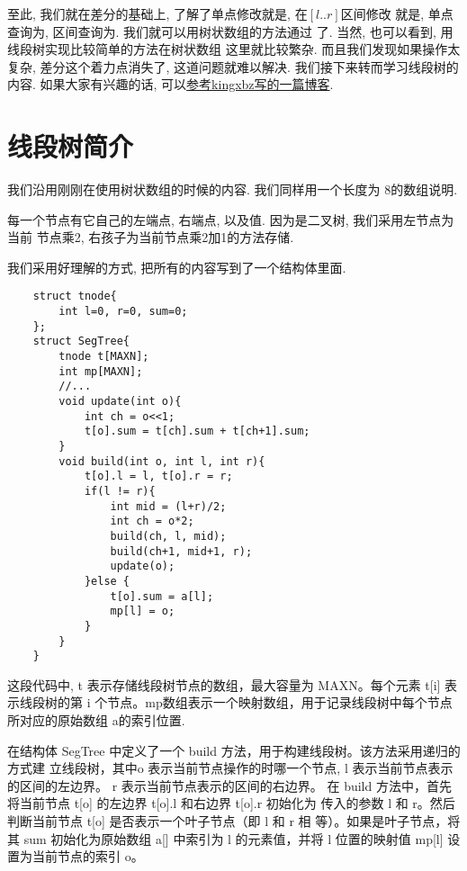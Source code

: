 至此,  我们就在差分的基础上, 了解了单点修改就是, 在$[l..r]$区间修改 
就是, 单点查询为, 
区间查询为. 我们就可以用树状数组的方法通过
了. 当然, 也可以看到, 用线段树实现比较简单的方法在树状数组
这里就比较繁杂. 而且我们发现如果操作太复杂, 差分这个着力点消失了, 这道问题就难以解决. 
我们接下来转而学习线段树的内容. 如果大家有兴趣的话, 可以\href{https://www.luogu.com.cn/blog/kingxbz/shu-zhuang-shuo-zu-zong-ru-men-dao-ru-fen}{参考kingxbz写的一篇博客}.

\section{线段树简介}

 我们沿用刚刚在使用树状数组的时候的内容. 我们同样用一个长度为
8的数组说明. 


每一个节点有它自己的左端点, 右端点, 以及值. 因为是二叉树, 我们采用左节点为当前
节点乘2, 右孩子为当前节点乘2加1的方法存储. 

 我们采用好理解的方式, 把所有的内容写到了一个结构体里面. 
\begin{lstlisting}
    struct tnode{
        int l=0, r=0, sum=0; 
    };
    struct SegTree{
        tnode t[MAXN]; 
        int mp[MAXN];
        //... 
        void update(int o){
            int ch = o<<1;
            t[o].sum = t[ch].sum + t[ch+1].sum;
        }
        void build(int o, int l, int r){
            t[o].l = l, t[o].r = r;
            if(l != r){
                int mid = (l+r)/2;
                int ch = o*2;
                build(ch, l, mid);
                build(ch+1, mid+1, r);
                update(o);
            }else {
                t[o].sum = a[l];
                mp[l] = o;
            }
        }
    }
\end{lstlisting}

这段代码中, t 表示存储线段树节点的数组，最大容量为 MAXN。每个元素 t[i] 表示线段树的第 i 个节点。mp数组表示一个映射数组，用于记录线段树中每个节点所对应的原始数组 a的索引位置.  

在结构体 SegTree 中定义了一个 build 方法，用于构建线段树。该方法采用递归的方式建
立线段树，其中o 表示当前节点操作的时哪一个节点, l 表示当前节点表示的区间的左边界。
r 表示当前节点表示的区间的右边界。
在 build 方法中，首先将当前节点 t[o] 的左边界 t[o].l 和右边界 t[o].r 初始化为
传入的参数 l 和 r。然后判断当前节点 t[o] 是否表示一个叶子节点（即 l 和 r 相
等）。如果是叶子节点，将其 sum 初始化为原始数组 a[] 中索引为 l 的元素值，并将 l 
位置的映射值 mp[l] 设置为当前节点的索引 o。

